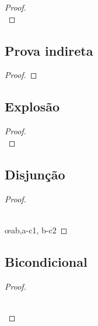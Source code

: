 \begin{multicols}{2}
\begin{proof}
\open
\close
{}

\\ 
\end{proof}

\subsection*{Prova indireta}

\begin{proof}
\open
\close
{}
\end{proof}


\subsection*{Explosão}

\begin{proof}
\\
\end{proof}

\subsection*{Disjunção}

\begin{proof}

\\	

\\	\open
	\close
	\open
	\close
	 \oe{ab,a-c1, b-c2}
\end{proof}

\subsection*{Bicondicional}

\begin{proof}
	\open
	\close
	\open
	\close

\\	
	 

\\	
	 
\end{proof}

\end{multicols}

